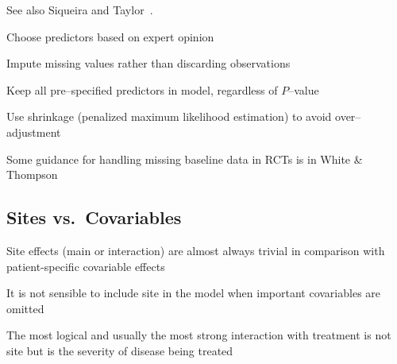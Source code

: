         See also Siqueira and Taylor~\cite{sig99tre}.
\item   Choose predictors based on expert opinion \ipacue
\item   Impute missing values rather than discarding observations
\item   Keep all pre--specified predictors in model, regardless of $P$--value
\item   Use shrinkage (penalized maximum likelihood estimation) to
        avoid over--adjustment
\item Some guidance for handling missing baseline data in RCTs is in
  White \& Thompson~\cite{whi05adj}
\ei

\subsection{Sites vs.\ Covariables}
\bi
\item Site effects (main or interaction) are almost always trivial in
  comparison with patient-specific covariable effects
\item It is not sensible to include site in the model when important
  covariables are omitted
\item The most logical and usually the most strong interaction with
  treatment is not site but is the severity of disease being treated
\ei

